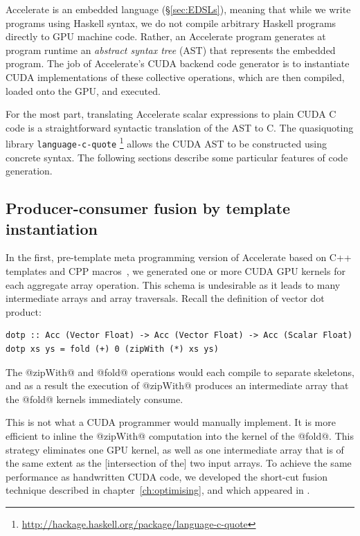Accelerate is an embedded language (\S\ref{sec:EDSLs}), meaning that while we
write programs using Haskell syntax, we do not compile arbitrary Haskell
programs directly to GPU machine code. Rather, an Accelerate program generates
at program runtime an \emph{abstract syntax tree} (AST) that represents the embedded program.
The job of Accelerate's CUDA backend code generator is to instantiate CUDA
implementations of these collective operations, which are then compiled, loaded
onto the GPU, and executed.

For the most part, translating Accelerate scalar expressions to plain CUDA C
code is a straightforward syntactic translation of the  AST
to C\@. The quasiquoting library \texttt{language-c-quote}%
\footnote{\url{http://hackage.haskell.org/package/language-c-quote}} allows the
CUDA AST to be constructed using concrete syntax. The following sections
describe some particular features of code generation.



\subsection{Producer-consumer fusion by template instantiation}
\label{sec:fusion_by_template_instantiation}

In the first, pre-template meta programming version of Accelerate based on C++
templates and CPP macros~\cite{Chakravarty:2011fr}, we generated one or more
CUDA GPU kernels for each aggregate array operation. This schema is undesirable
as it leads to many intermediate arrays and array traversals. Recall the
definition of vector dot product:
%
\begin{lstlisting}[style=haskell]
dotp :: Acc (Vector Float) -> Acc (Vector Float) -> Acc (Scalar Float)
dotp xs ys = fold (+) 0 (zipWith (*) xs ys)
\end{lstlisting}
%
The @zipWith@ and @fold@ operations would each compile to separate
skeletons, and as a result the execution of @zipWith@ produces an
intermediate array that the @fold@ kernels immediately consume.

This is not what a CUDA programmer would manually implement. It is more
efficient to inline the @zipWith@ computation into the kernel of the
@fold@. This strategy eliminates one GPU kernel, as well as one
intermediate array that is of the same extent as the [intersection of the] two
input arrays. To achieve the same performance as handwritten CUDA code, we
developed the short-cut fusion technique described in
chapter~\ref{ch:optimising}, and which appeared in \cite{McDonell:2013wi}.

